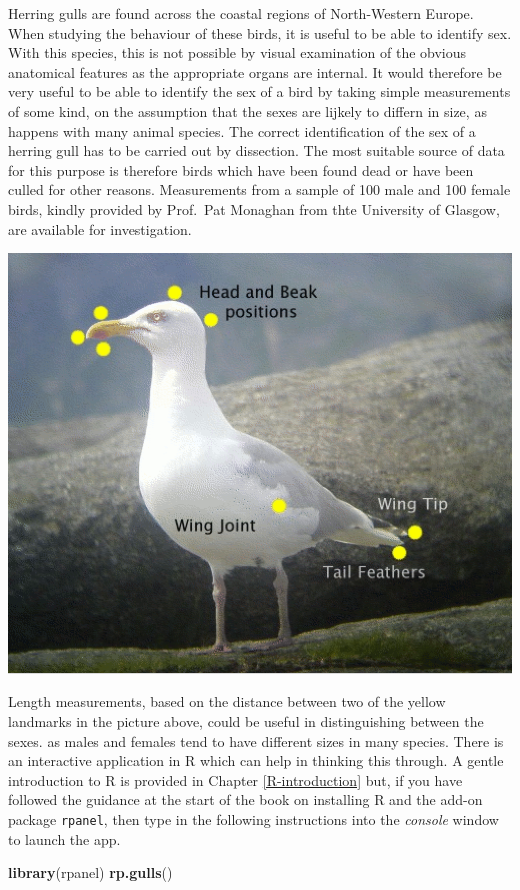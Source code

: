\documentclass[
]{book}
\newenvironment{Shaded}{\begin{snugshade}}{\end{snugshade}}
\newcommand{\FunctionTok}[1]{\textcolor[rgb]{0.13,0.29,0.53}{\textbf{#1}}}
\newcommand{\NormalTok}[1]{#1}
\begin{document}
Herring gulls are found across the coastal regions of North-Western Europe. When studying the behaviour of these birds, it is useful to be able to identify sex. With this species, this is not possible by visual examination of the obvious anatomical features as the appropriate organs are internal. It would therefore be very useful to be able to identify the sex of a bird by taking simple measurements of some kind, on the assumption that the sexes are lijkely to differn in size, as happens with many animal species. The correct identification of the sex of a herring gull has to be carried out by dissection. The most suitable source of data for this purpose is therefore birds which have been found dead or have been culled for other reasons. Measurements from a sample of 100 male and 100 female birds, kindly provided by Prof.~Pat Monaghan from thte University of Glasgow, are available for investigation.

\begin{center}\includegraphics[width=0.5\linewidth]{images/herring-gull} \end{center}

Length measurements, based on the distance between two of the yellow landmarks in the picture above, could be useful in distinguishing between the sexes. as males and females tend to have different sizes in many species. There is an interactive application in R which can help in thinking this through. A gentle introduction to R is provided in Chapter \ref{R-introduction} but, if you have followed the guidance at the start of the book on installing R and the add-on package \texttt{rpanel}, then type in the following instructions into the \emph{console} window to launch the app.

\begin{Shaded}
\begin{Highlighting}[]
\FunctionTok{library}\NormalTok{(rpanel)}
\FunctionTok{rp.gulls}\NormalTok{()}
\end{Highlighting}
\end{Shaded}
\end{document}
